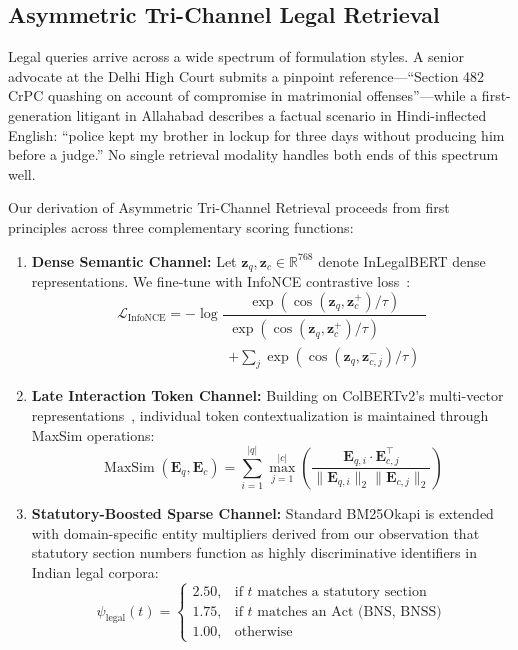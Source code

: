 \documentclass[conference]{IEEEtran}
\begin{document}
\subsection{Asymmetric Tri-Channel Legal Retrieval}
Legal queries arrive across a wide spectrum of formulation styles. A senior advocate at the Delhi High Court submits a pinpoint reference---``Section 482 CrPC quashing on account of compromise in matrimonial offenses''---while a first-generation litigant in Allahabad describes a factual scenario in Hindi-inflected English: ``police kept my brother in lockup for three days without producing him before a judge.'' No single retrieval modality handles both ends of this spectrum well.

Our derivation of Asymmetric Tri-Channel Retrieval proceeds from first principles across three complementary scoring functions:
\begin{enumerate}
    \item \textbf{Dense Semantic Channel:} Let $\mathbf{z}_q, \mathbf{z}_c \in \mathbb{R}^{768}$ denote InLegalBERT dense representations. We fine-tune with InfoNCE contrastive loss~\cite{oord2018infonce}:
    \begin{equation}
    \mathcal{L}_{\text{InfoNCE}} = -\log \frac{\exp(\cos(\mathbf{z}_q, \mathbf{z}_c^+) / \tau)}{\substack{\exp(\cos(\mathbf{z}_q, \mathbf{z}_c^+) / \tau) \\ + \sum_{j} \exp(\cos(\mathbf{z}_q, \mathbf{z}_{c, j}^-) / \tau)}}
    \end{equation}
    \item \textbf{Late Interaction Token Channel:} Building on ColBERTv2's multi-vector representations~\cite{santhanam2022colbertv2}, individual token contextualization is maintained through MaxSim operations:
    \begin{equation}
    \operatorname{MaxSim}(\mathbf{E}_q, \mathbf{E}_c) = \sum_{i=1}^{|q|} \max_{j=1}^{|c|} \left( \frac{\mathbf{E}_{q, i} \cdot \mathbf{E}_{c, j}^\top}{\|\mathbf{E}_{q, i}\|_2 \|\mathbf{E}_{c, j}\|_2} \right)
    \end{equation}
    \item \textbf{Statutory-Boosted Sparse Channel:} Standard BM25Okapi is extended with domain-specific entity multipliers derived from our observation that statutory section numbers function as highly discriminative identifiers in Indian legal corpora:
    \begin{equation}
    \psi_{\text{legal}}(t) = \begin{cases}
    2.50, & \text{if } t \text{ matches a statutory section} \\
    1.75, & \text{if } t \text{ matches an Act (BNS, BNSS)} \\
    1.00, & \text{otherwise}
    \end{cases}
    \end{equation}
\end{enumerate}
\end{document}

